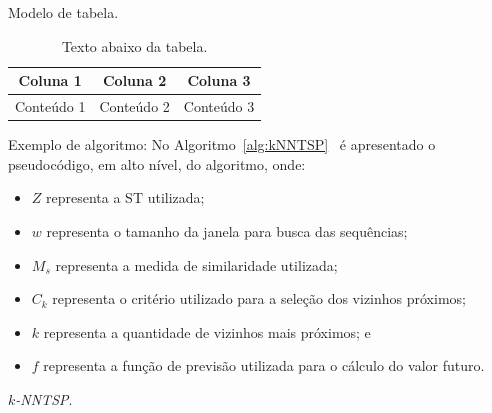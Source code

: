 Modelo de tabela.
\begin{table}[!htb]
	\centering	
	\label{tab:tab_exemplo}
\begin{tabular}{|c|c|c|}
\hline 
Coluna 1 & Coluna 2 & Coluna 3 \\ 
\hline 
Conteúdo 1 & Conteúdo 2 & Conteúdo 3 \\ 
\hline 
\end{tabular} 
\caption[Texto da lista de tabelas]{Texto abaixo da tabela.}
\end{table}

Exemplo de algoritmo:
No Algoritmo~\ref{alg:kNNTSP}~\cite{Ferrero2009} é apresentado o pseudocódigo, em alto nível, do algoritmo, onde:
\begin{itemize}
\item $Z$ representa a ST utilizada;
\item $w$ representa o tamanho da janela para busca das sequências;
\item $M_s$ representa a medida de similaridade utilizada;
\item $C_k$ representa o critério utilizado para a seleção dos vizinhos próximos;
\item $k$ representa a quantidade de vizinhos mais próximos; e
\item $f$ representa a função de previsão utilizada para o cálculo do valor futuro.
\end{itemize}

\begin{algorithm}[hbtp]
\caption{\textit{$k$-NNTSP}.}
\label{alg:kNNTSP}
\end{algorithm}

